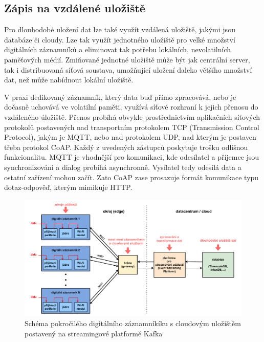 \subsection{Zápis na vzdálené uložiště}
\label{zapis_na_vzdalene_uloziste}
Pro dlouhodobé uložení dat lze také využít vzdálená uložiště, jakými jsou databáze či cloudy. Lze tak využít jednotného uložiště pro velké množství digitálních záznamníků a eliminovat tak potřebu lokálních, nevolatilních paměťových médií. Zmiňované jednotné uložiště může být jak centrální server, tak i distribuovaná síťová soustava, umožňující uložení daleko většího množství dat, než může nabídnout lokální uložiště.

V praxi dedikovaný záznamník, který data buď přímo zpracovává, nebo je dočasně uchovává ve volatilní paměti, využívá síťové rozhraní k jejich přenosu do vzdáleného úložiště. Přenos probíhá obvykle prostřednictvím aplikačních síťových protokolů postavených nad transportním protokolem TCP (Transmission Control Protocol), jakým je MQTT, nebo nad protokolem UDP, nad kterým je postaven třeba protokol CoAP. Každý z uvedených zástupců poskytuje trošku odlišnou funkcionalitu. MQTT je vhodnější pro komunikaci, kde odesílatel a příjemce jsou synchronizováni a dialog probíhá asynchronně. Vysílatel tedy odesílá data a ostatní zařízení mohou začít. Zato CoAP zase prosazuje formát komunikace typu dotaz-odpověď, kterým mimikuje HTTP. \cite{emq_mqtt_vs_coap}


\begin{figure}[h]
    \centering
    \includegraphics[width=1.00\textwidth]{obrazky-figures/advanced_architecture_of_datalogging.pdf}
    
    \caption{Schéma pokročilého digitálního záznamníkíku s cloudovým uložištěm postavený na streamingové platformě Kafka \cite{confluent_advanced_datalogging, influxdata_advanced_datalogging_mmqt}}
    \label{fig:advanced-architecture-of-datalogging}
\end{figure}

